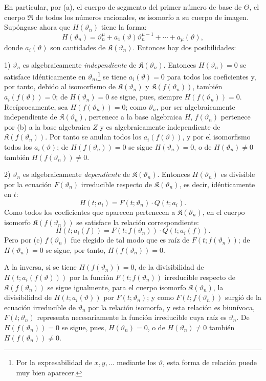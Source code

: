 En particular, por (a), el cuerpo de segmento del primer número de base de $\Theta$, el cuerpo $\mathfrak R$ de todos los números racionales, es isomorfo a su cuerpo de imagen. Supóngase ahora que $H(\vartheta_n)$ tiene la forma:
\[
H(\vartheta_n)=\vartheta_n^{\mu}+a_1(\vartheta)\vartheta_n^{\mu-1}+\cdots+a_\mu(\vartheta),
\]
donde $a_i(\vartheta)$ son cantidades de $\mathfrak K(\vartheta_n)$. Entonces hay dos posibilidades:

1) $\vartheta_n$ es algebraicamente \emph{independiente} de $\mathfrak K(\vartheta_n)$. Entonces $H(\vartheta_n)=0$ se satisface idénticamente en $\vartheta_n$,\footnote{Por la expresabilidad de $x,y,\ldots$ mediante los $\vartheta$, esta forma de relación puede muy bien aparecer.} se tiene $a_i(\vartheta)=0$ para todos los coeficientes y, por tanto, debido al isomorfismo de $\mathfrak K(\vartheta_n)$ y $\mathfrak K(f(\vartheta_n))$, también $a_i(f(\vartheta))=0$; de $H(\vartheta_n)=0$ se sigue, pues, siempre $H(f(\vartheta_n))=0$. Recíprocamente, sea $H(f(\vartheta_n))=0$; como $\vartheta_n$, por ser algebraicamente independiente de $\mathfrak K(\vartheta_n)$, pertenece a la base algebraica $H$, $f(\vartheta_n)$ pertenece por (b) a la base algebraica $Z$ y es algebraicamente independiente de $\mathfrak K(f(\vartheta_n))$. Por tanto se anulan todos los $a_i(f(\vartheta))$, y por el isomorfismo todos los $a_i(\vartheta)$; de $H(f(\vartheta_n))=0$ se sigue $H(\vartheta_n)=0$, o de $H(\vartheta_n)\ne0$ también $H(f(\vartheta_n))\ne0$.

2) $\vartheta_n$ es algebraicamente \emph{dependiente} de $\mathfrak K(\vartheta_n)$. Entonces $H(\vartheta_n)$ es divisible por la ecuación $F(\vartheta_n)$ irreducible respecto de $\mathfrak K(\vartheta_n)$, es decir, idénticamente en $t$:
\[
H(t;a_i)=F(t;\vartheta_n)\cdot Q(t;a_i).
\]
Como todos los coeficientes que aparecen pertenecen a $\mathfrak K(\vartheta_n)$, en el cuerpo isomorfo $\mathfrak K(f(\vartheta_n))$ se satisface la relación correspondiente:
\[
H(t;a_i(f))=F(t;f(\vartheta_n))\cdot Q(t;a_i(f)).
\]
Pero por (c) $f(\vartheta_n)$ fue elegido de tal modo que es raíz de $F(t;f(\vartheta_n))$; de $H(\vartheta_n)=0$ se sigue, por tanto, $H(f(\vartheta_n))=0$.

A la inversa, si se tiene $H(f(\vartheta_n))=0$, de la divisibilidad de $H(t;a_i(f(\vartheta)))$ por la función $F(t;f(\vartheta_n))$ irreducible respecto de $\mathfrak K(f(\vartheta_n))$ se sigue igualmente, para el cuerpo isomorfo $\mathfrak K(\vartheta_n)$, la divisibilidad de $H(t;a_i(\vartheta))$ por $F(t;\vartheta_n)$; y como $F(t;f(\vartheta_n))$ surgió de la ecuación irreducible de $\vartheta_n$ por la relación isomorfa, y esta relación es biunívoca, $F(t;\vartheta_n)$ representa necesariamente la función irreducible cuya raíz es $\vartheta_n$. De $H(f(\vartheta_n))=0$ se sigue, pues, $H(\vartheta_n)=0$, o de $H(\vartheta_n)\ne0$ también $H(f(\vartheta_n))\ne0$.

